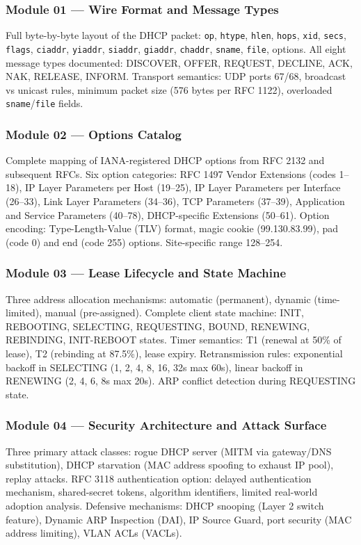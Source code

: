 \documentclass[11pt,letterpaper]{article}
\begin{document}
\subsubsection{Module 01 --- Wire Format and Message Types}
Full byte-by-byte layout of the DHCP packet: \texttt{op}, \texttt{htype}, \texttt{hlen}, \texttt{hops}, \texttt{xid}, \texttt{secs}, \texttt{flags}, \texttt{ciaddr}, \texttt{yiaddr}, \texttt{siaddr}, \texttt{giaddr}, \texttt{chaddr}, \texttt{sname}, \texttt{file}, options. All eight message types documented: DISCOVER, OFFER, REQUEST, DECLINE, ACK, NAK, RELEASE, INFORM. Transport semantics: UDP ports 67/68, broadcast vs unicast rules, minimum packet size (576 bytes per RFC 1122), overloaded \texttt{sname}/\texttt{file} fields.

\subsubsection{Module 02 --- Options Catalog}
Complete mapping of IANA-registered DHCP options from RFC 2132 and subsequent RFCs. Six option categories: RFC 1497 Vendor Extensions (codes 1--18), IP Layer Parameters per Host (19--25), IP Layer Parameters per Interface (26--33), Link Layer Parameters (34--36), TCP Parameters (37--39), Application and Service Parameters (40--78), DHCP-specific Extensions (50--61). Option encoding: Type-Length-Value (TLV) format, magic cookie (99.130.83.99), pad (code 0) and end (code 255) options. Site-specific range 128--254.

\subsubsection{Module 03 --- Lease Lifecycle and State Machine}
Three address allocation mechanisms: automatic (permanent), dynamic (time-limited), manual (pre-assigned). Complete client state machine: INIT, REBOOTING, SELECTING, REQUESTING, BOUND, RENEWING, REBINDING, INIT-REBOOT states. Timer semantics: T1 (renewal at 50\% of lease), T2 (rebinding at 87.5\%), lease expiry. Retransmission rules: exponential backoff in SELECTING (1, 2, 4, 8, 16, 32s max 60s), linear backoff in RENEWING (2, 4, 6, 8s max 20s). ARP conflict detection during REQUESTING state.

\subsubsection{Module 04 --- Security Architecture and Attack Surface}
Three primary attack classes: rogue DHCP server (MITM via gateway/DNS substitution), DHCP starvation (MAC address spoofing to exhaust IP pool), replay attacks. RFC 3118 authentication option: delayed authentication mechanism, shared-secret tokens, algorithm identifiers, limited real-world adoption analysis. Defensive mechanisms: DHCP snooping (Layer 2 switch feature), Dynamic ARP Inspection (DAI), IP Source Guard, port security (MAC address limiting), VLAN ACLs (VACLs).
\end{document}
